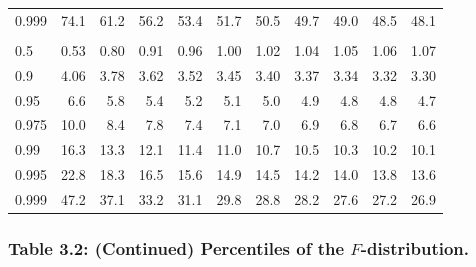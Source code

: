 \documentclass[]{article}
\begin{document}
\begin{table}[H]
\begin{tabular}{lrrrrrrrrrr}
\hspace{1em}0.999 & 74.1 & 61.2 & 56.2 & 53.4 & 51.7 & 50.5 & 49.7 & 49.0 & 48.5 & 48.1\\
\addlinespace[0.3em]
\multicolumn{11}{l}{\textbf{$k_2=5$}}\\
\hspace{1em}0.5 & 0.53 & 0.80 & 0.91 & 0.96 & 1.00 & 1.02 & 1.04 & 1.05 & 1.06 & 1.07\\
\hspace{1em}0.9 & 4.06 & 3.78 & 3.62 & 3.52 & 3.45 & 3.40 & 3.37 & 3.34 & 3.32 & 3.30\\
\hspace{1em}0.95 & 6.6 & 5.8 & 5.4 & 5.2 & 5.1 & 5.0 & 4.9 & 4.8 & 4.8 & 4.7\\
\hspace{1em}0.975 & 10.0 & 8.4 & 7.8 & 7.4 & 7.1 & 7.0 & 6.9 & 6.8 & 6.7 & 6.6\\
\hspace{1em}0.99 & 16.3 & 13.3 & 12.1 & 11.4 & 11.0 & 10.7 & 10.5 & 10.3 & 10.2 & 10.1\\
\hspace{1em}0.995 & 22.8 & 18.3 & 16.5 & 15.6 & 14.9 & 14.5 & 14.2 & 14.0 & 13.8 & 13.6\\
\hspace{1em}0.999 & 47.2 & 37.1 & 33.2 & 31.1 & 29.8 & 28.8 & 28.2 & 27.6 & 27.2 & 26.9\\
\bottomrule
\end{tabular}
\end{table}

\hypertarget{table-3.2-continued-percentiles-of-the-f-distribution.}{%
\subsubsection{\texorpdfstring{Table 3.2: (Continued) Percentiles of the
\(F\)-distribution.}{Table 3.2: (Continued) Percentiles of the F-distribution.}}\label{table-3.2-continued-percentiles-of-the-f-distribution.}}
\end{document}
